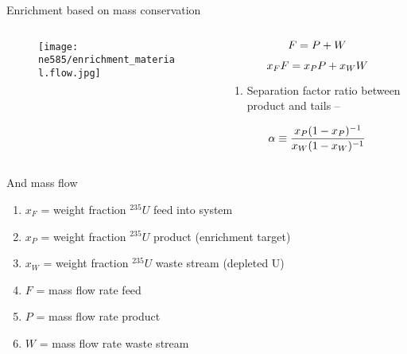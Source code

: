 \documentclass[aspectratio=1610,pdftex,dvipsnames,compress,xcolor={dvipsnames}]{beamer}
\begin{document}
\begin{frame}{Enrichment based on mass conservation}
    \begin{columns}[t]

        \begin{column}{0.40\textwidth}
            \begin{figure}
                \centering
                \texttt{[image: ne585/enrichment\_material.flow.jpg]}
            \end{figure}
        \end{column}

        \begin{column}{0.60\textwidth}
            \begin{equation}
                \LARGE
                F = P + W
            \end{equation}
            
            \begin{equation}
                \LARGE
                x_F F = x_P P +x_W W
            \end{equation}
            
            \vspace*{\fill}

            \begin{enumerate}[series=outerlist,topsep=0pt,itemsep=21pt,leftmargin=*,label=(\arabic*)]
                \item[]Separation factor ratio between product and tails --
            \end{enumerate}
            
            \vspace*{\fill}

            \begin{equation}
                \LARGE
                \alpha \equiv \frac{x_P(1-x_P)^{-1}}{x_W(1-x_W)^{-1}}
            \end{equation}
        \end{column}

    \end{columns}
\end{frame}


\begin{frame}{And mass flow}
    \begin{enumerate}[topsep=0pt,itemsep=11pt,leftmargin=*,label=(\arabic*)]
        \item[]$x_F$ = weight fraction $^{235}U$ feed into system
        \item[]$x_P$ = weight fraction $^{235}U$ product (enrichment target)
        \item[]$x_W$ = weight fraction $^{235}U$ waste stream (depleted U)
        \item[]$F$ = mass flow rate feed
        \item[]$P$ = mass flow rate product
        \item[]$W$ = mass flow rate waste stream
    \end{enumerate}
\end{frame}
\end{document}
